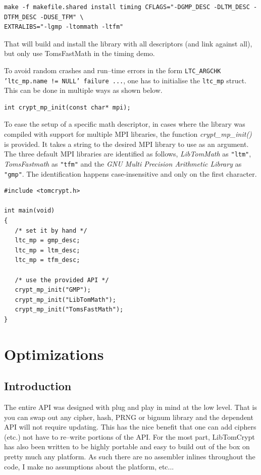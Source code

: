 \documentclass[synpaper]{book}
\newcommand{\mysection}[1]    %
	{                   %
	\section{#1}
   \markboth{\textsf{www.libtom.net}}{\thesection ~ {#1}}
	}
\begin{document}
     
\begin{small}
\begin{verbatim}
make -f makefile.shared install timing CFLAGS="-DGMP_DESC -DLTM_DESC -DTFM_DESC -DUSE_TFM" \
EXTRALIBS="-lgmp -ltommath -ltfm"
\end{verbatim}
\end{small}

That will build and install the library with all descriptors (and link against all), but only use TomsFastMath in the timing demo.

To avoid random crashes and run--time errors in the form \texttt{LTC\_ARGCHK 'ltc\_mp.name != NULL' failure ...}, one has to
initialise the \texttt{ltc\_mp} struct. This can be done in multiple ways as shown below.

\begin{verbatim}
int crypt_mp_init(const char* mpi);
\end{verbatim}

To ease the setup of a specific math descriptor, in cases where the library was compiled with support for multiple MPI libraries,
the function \textit{crypt\_mp\_init()} is provided.
It takes a string to the desired MPI library to use as an argument.
The three default MPI libraries are identified as follows, \textit{LibTomMath} as \texttt{"ltm"}, \textit{TomsFastmath} as \texttt{"tfm"}
and the \textit{GNU Multi Precision Arithmetic Library} as \texttt{"gmp"}.
The identification happens case-insensitive and only on the first character.


\begin{verbatim}
#include <tomcrypt.h>

int main(void)
{
   /* set it by hand */
   ltc_mp = gmp_desc;
   ltc_mp = ltm_desc;
   ltc_mp = tfm_desc;

   /* use the provided API */
   crypt_mp_init("GMP");
   crypt_mp_init("LibTomMath");
   crypt_mp_init("TomsFastMath");
}
\end{verbatim}


\chapter{Optimizations}
\mysection{Introduction}
The entire API was designed with plug and play in mind at the low level.  That is you can swap out any cipher, hash, PRNG or bignum library and the dependent API will not
require updating.  This has the nice benefit that one can add ciphers (etc.) not have to re--write portions of the API.  For the most part, LibTomCrypt has also been written
to be highly portable and easy to build out of the box on pretty much any platform.  As such there are no assembler inlines throughout the code, I make no assumptions
about the platform, etc...
\end{document}
